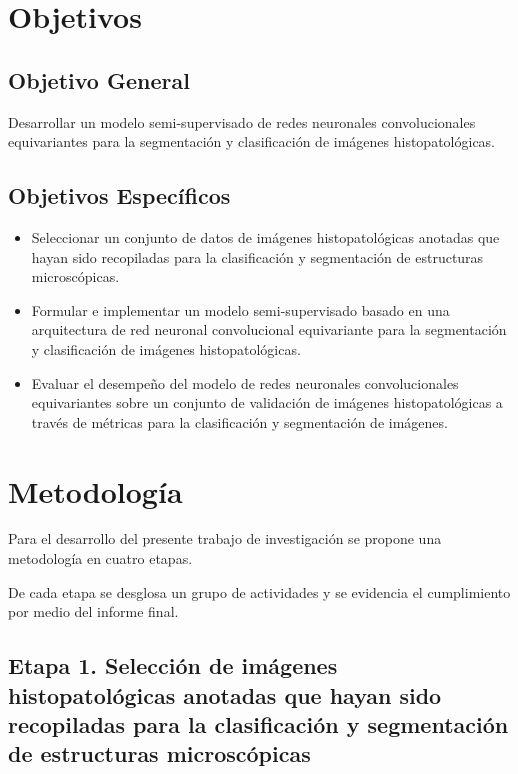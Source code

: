 \documentclass[12pt,letterpaper,final, openany]{scrbook}
\begin{document}
\newpage
\chapter{Objetivos}
\section{Objetivo General}

Desarrollar un modelo semi-supervisado de redes neuronales convolucionales equivariantes para la segmentación y clasificación de imágenes histopatológicas.


\section{Objetivos Específicos}

\begin{itemize}
    \item Seleccionar un conjunto de datos de imágenes histopatológicas anotadas que hayan sido recopiladas para la clasificación y segmentación de estructuras microscópicas.
    
    \item Formular e implementar un modelo semi-supervisado basado en una arquitectura de red neuronal convolucional equivariante para la segmentación y clasificación de imágenes histopatológicas.
    
    \item Evaluar el desempeño del modelo de redes neuronales convolucionales equivariantes sobre un conjunto de validación de imágenes histopatológicas a través de métricas para la clasificación y segmentación de imágenes.

    
\end{itemize}


\newpage
\chapter{Metodología}

Para el desarrollo del presente trabajo de investigación se propone una metodología en cuatro etapas.

De cada etapa se desglosa un grupo de actividades y se evidencia el cumplimiento por medio del informe final.


\section{Etapa 1. Selección de imágenes histopatológicas anotadas que hayan sido recopiladas para la clasificación y segmentación de estructuras microscópicas}
\end{document}
